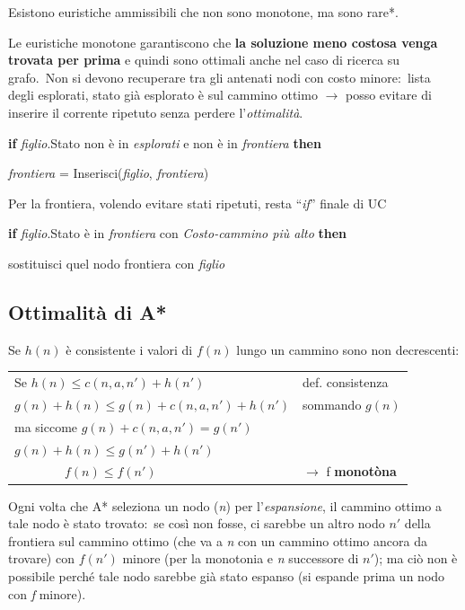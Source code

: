 \noindent Esistono euristiche ammissibili che non sono monotone, ma sono rare*.\

Le euristiche monotone garantiscono che \textbf{la soluzione meno costosa venga trovata per prima} e quindi sono ottimali anche nel caso di ricerca su grafo.\ Non si devono recuperare tra gli antenati nodi con costo minore:\ lista degli esplorati, stato già esplorato è sul cammino ottimo $\rightarrow$ posso evitare di inserire il corrente ripetuto senza perdere l'\textit{ottimalità}.

\begin{flushleft}
	\textbf{if} \textit{figlio}.Stato non è in \textit{esplorati} e non è in \textit{frontiera} \textbf{then}

	\quad \textit{frontiera} = Inserisci(\textit{figlio}, \textit{frontiera})\newline

	Per la frontiera, volendo evitare stati ripetuti, resta ``\textit{if}'' finale di UC

	\textbf{if} \textit{figlio}.Stato è in \textit{frontiera} con \textit{Costo-cammino più alto} \textbf{then}

	\quad sostituisci quel nodo frontiera con \textit{figlio}
\end{flushleft}

\subsection{Ottimalità di A*}

Se $h(n)$ è consistente i valori di $f(n)$ lungo un cammino sono non decrescenti:
\begin{table}[H]
	\centering
	\begin{tabular}{l l}
		Se $h(n) \leq c(n, a, n') + h(n')$             & def. consistenza                  \\
		$g(n) + h(n) \leq g(n) + c(n, a, n') + h(n') $ & sommando $g(n)$                   \\
		ma siccome $g(n) + c(n, a, n') = g(n')$        &                                   \\
		$g(n) + h(n) \leq g(n') + h(n')$               &                                   \\
		$ \qquad \qquad f(n) \leq f(n')$               & $\rightarrow$ f \textbf{monotòna} \\
	\end{tabular}
\end{table}

\noindent Ogni volta che A* seleziona un nodo (\textit{n}) per l'\textit{espansione}, il cammino ottimo a tale nodo è stato trovato:\
se così non fosse, ci sarebbe un altro nodo $n'$ della frontiera sul cammino ottimo (che va a \textit{n} con un cammino ottimo ancora da trovare) con $f(n')$ minore (per la monotonia e \textit{n} successore di $n'$); ma ciò non è possibile perché tale nodo sarebbe già stato espanso (si espande prima un nodo con \textit{f} minore).\

